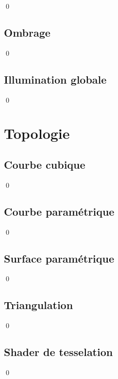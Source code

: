\documentclass[12pt]{article}
\newcommand{\state}{\noindent}
\begin{document}
\state

\qed

\subsection{Ombrage}

\state

\qed

\subsection{Illumination globale}

\state

\qed

\pagebreak

\section{Topologie}

\subsection{Courbe cubique}

\state

\qed

\subsection{Courbe paramétrique}

\state

\qed

\subsection{Surface paramétrique}

\state

\qed

\subsection{Triangulation}

\state

\qed

\subsection{Shader de tesselation}

\state

\qed
\end{document}
